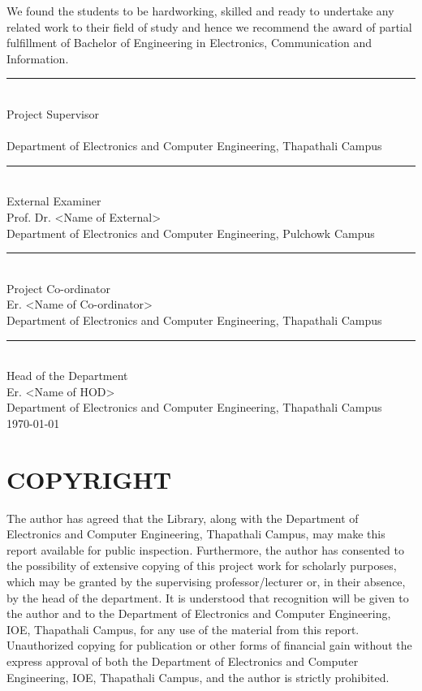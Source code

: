 \documentclass{ioereport}
\begin{document}
    We found the students to be hardworking, skilled and ready to undertake any related work to their field of study and hence we recommend the award of partial fulfillment of Bachelor of Engineering in Electronics, Communication and Information. \\
    
    \rule{0.5\linewidth}{0.4pt}\\
    Project Supervisor\\
    \supervisorname\\
    Department of Electronics and Computer Engineering, Thapathali Campus\\

    \rule{0.5\linewidth}{0.4pt} \\
    External Examiner \\
    Prof. Dr. \textless Name of External\textgreater\\
    Department of Electronics and Computer Engineering, Pulchowk Campus\\

    \rule{0.5\linewidth}{0.4pt} \\
    Project Co-ordinator\\
    Er. \textless Name of Co-ordinator\textgreater \\
    Department of Electronics and Computer Engineering, Thapathali Campus\\

    \rule{0.5\linewidth}{0.4pt} \\
    Head of the Department \\ 
    Er. \textless Name of HOD\textgreater \\ 
    Department of Electronics and Computer Engineering, Thapathali Campus\\

    \today

    \pagebreak

\section*{COPYRIGHT}
    The author has agreed that the Library, along with the Department of Electronics and Computer Engineering, Thapathali Campus, may make this report available for public inspection. Furthermore, the author has consented to the possibility of extensive copying of this project work for scholarly purposes, which may be granted by the supervising professor/lecturer or, in their absence, by the head of the department. It is understood that recognition will be given to the author and to the Department of Electronics and Computer Engineering, IOE, Thapathali Campus, for any use of the material from this report. Unauthorized copying for publication or other forms of financial gain without the express approval of both the Department of Electronics and Computer Engineering, IOE, Thapathali Campus, and the author is strictly prohibited.
\end{document}
